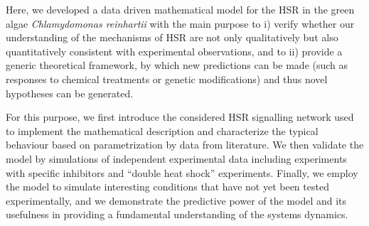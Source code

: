 \documentclass[oneside, 10pt, a4paper, twocolumn]{article}
\begin{document}

Here, we developed a data driven mathematical model for the HSR in the green algae \emph{Chlamydomonas reinhartii}
with the main purpose to i) verify whether our understanding of the mechanisms of HSR are not only qualitatively but also quantitatively  consistent with experimental observations,
and to ii) provide a generic theoretical framework, by which new predictions can be made (such as responses to chemical treatments or genetic modifications) 
and thus novel hypotheses can be generated.

For this purpose, we first introduce the considered HSR signalling network used to implement the mathematical description and characterize the typical behaviour 
based on parametrization by data from literature. 
We then validate the model by simulations of independent experimental data including experiments with specific inhibitors and  ``double heat shock'' experiments. 
Finally, we employ the model to simulate interesting conditions that have not yet been 
tested experimentally, and we demonstrate the predictive power of the model and its usefulness in providing a fundamental understanding of the 
systems dynamics. 
\end{document}
